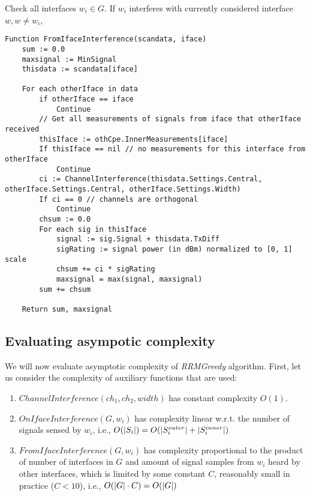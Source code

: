 Check all interfaces $w_i \in G$.
If $w_i$ interferes with currently considered interface $w, w \ne w_i$,
\begin{lstlisting}[language={Pseudo}, caption=FromIfaceInterference() function, label=lst:interf_from_cpe]
Function FromIfaceInterference(scandata, iface)
    sum := 0.0
    maxsignal := MinSignal
    thisdata := scandata[iface]

    For each otherIface in data
        if otherIface == iface
            Continue
        // Get all measurements of signals from iface that otherIface received
        thisIface := othCpe.InnerMeasurements[iface]
        If thisIface == nil // no measurements for this interface from otherIface
            Continue
        ci := ChannelInterference(thisdata.Settings.Central, otherIface.Settings.Central, otherIface.Settings.Width)
        If ci == 0 // channels are orthogonal
            Continue
        chsum := 0.0
        For each sig in thisIface
            signal := sig.Signal + thisdata.TxDiff
            sigRating := signal power (in dBm) normalized to [0, 1] scale
            chsum += ci * sigRating
            maxsignal = max(signal, maxsignal)
        sum += chsum

    Return sum, maxsignal
\end{lstlisting}

\subsection{Evaluating asympotic complexity}
\label{sec:complexity}
We will now evaluate asymptotic complexity of \textit{RRMGreedy} algorithm.
First, let us consider the complexity of auxiliary functions that are used:
\begin{enumerate}
    \item $ChannelInterference(ch_1, ch_2, width)$ has constant complexity $O(1)$.
    \item $OnIfaceInterference(G, w_i)$ has complexity linear w.r.t. the number of signals sensed by $w_i$, i.e.,
        $O(\lvert{S_i}\rvert) = O(\lvert{S^{outer}_i}\rvert + \lvert{S^{inner}_i}\rvert)$
    \item $FromIfaceInterference(G, w_i)$ has complexity proportional to the product of number of interfaces in $G$ and amount of signal samples from $w_i$ heard by other interfaces, which is limited by some constant $C$, reasonably small in practice ($C < 10$), i.e.,
        $O(\lvert{G}\rvert \cdot C) = O(\lvert{G}\rvert)$
\end{enumerate}

